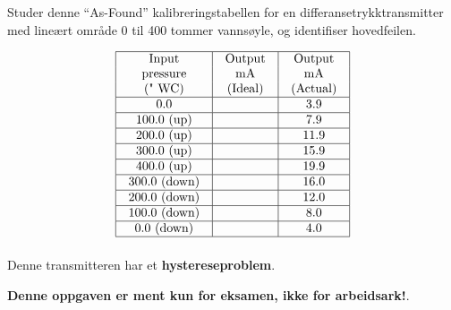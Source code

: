 

Studer denne ``As-Found'' kalibreringstabellen for en differansetrykktransmitter med lineært område 0 til 400 tommer vannsøyle, og identifiser hovedfeilen.


$$\vbox{\offinterlineskip
\halign{\strut
\vrule \quad\hfil # \ \hfil & 
\vrule \quad\hfil # \ \hfil & 
\vrule \quad\hfil # \ \hfil \vrule \cr
\noalign{\hrule}
%
Input & Output & Output \cr
%
pressure & mA & mA \cr
%
(" WC) & (Ideal) & (Actual) \cr
%
\noalign{\hrule}
%
0.0 & & 3.9 \cr
%
\noalign{\hrule}
%
100.0 (up) & & 7.9 \cr
%
\noalign{\hrule}
%
200.0 (up) & & 11.9 \cr
%
\noalign{\hrule}
%
300.0 (up) & & 15.9 \cr
%
\noalign{\hrule}
%
400.0 (up) & & 19.9 \cr
%
\noalign{\hrule}
%
300.0 (down) & & 16.0 \cr
%
\noalign{\hrule}
%
200.0 (down) & & 12.0 \cr
%
\noalign{\hrule}
%
100.0 (down) & & 8.0 \cr
%
\noalign{\hrule}
%
0.0 (down) & & 4.0 \cr
%
\noalign{\hrule}
} %
}$$ %







Denne transmitteren har et {\bf hystereseproblem}.







{\bf Denne oppgaven er ment kun for eksamen, ikke for arbeidsark!}.


